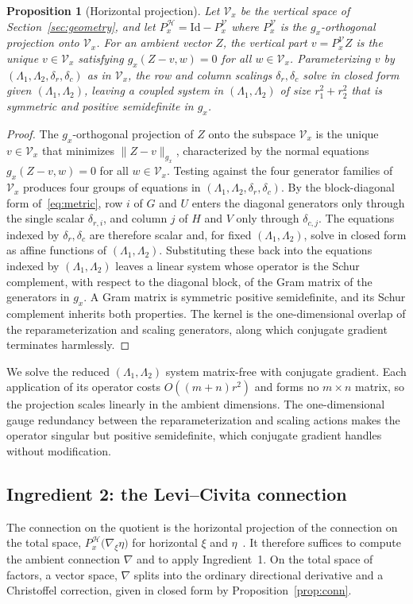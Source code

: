 \documentclass[letterpaper, 10 pt, conference]{ieeeconf}
\newcommand{\cV}{\mathcal{V}}
\newcommand{\cH}{\mathcal{H}}
\theoremstyle{plain}
\newtheorem{proposition}{Proposition}
\theoremstyle{definition}
\theoremstyle{remark}
\begin{document}
\begin{proposition}[Horizontal projection]\label{prop:hproj}
Let $\cV_x$ be the vertical space of Section~\ref{sec:geometry}, and let $P_x^{\cH}=\mathrm{Id}-P_x^{\cV}$ where $P_x^{\cV}$ is the $g_x$-orthogonal projection onto $\cV_x$. For an ambient vector $Z$, the vertical part $v=P_x^{\cV}Z$ is the unique $v\in\cV_x$ satisfying $g_x(Z-v,w)=0$ for all $w\in\cV_x$. Parameterizing $v$ by $(\Lambda_1,\Lambda_2,\delta_r,\delta_c)$ as in $\cV_x$, the row and column scalings $\delta_r,\delta_c$ solve in closed form given $(\Lambda_1,\Lambda_2)$, leaving a coupled system in $(\Lambda_1,\Lambda_2)$ of size $r_1^2+r_2^2$ that is symmetric and positive semidefinite in $g_x$.
\end{proposition}
\begin{proof}
The $g_x$-orthogonal projection of $Z$ onto the subspace $\cV_x$ is the unique $v\in\cV_x$ that minimizes $\|Z-v\|_{g_x}$, characterized by the normal equations $g_x(Z-v,w)=0$ for all $w\in\cV_x$. Testing against the four generator families of $\cV_x$ produces four groups of equations in $(\Lambda_1,\Lambda_2,\delta_r,\delta_c)$. By the block-diagonal form of~\eqref{eq:metric}, row $i$ of $G$ and $U$ enters the diagonal generators only through the single scalar $\delta_{r,i}$, and column $j$ of $H$ and $V$ only through $\delta_{c,j}$. The equations indexed by $\delta_r,\delta_c$ are therefore scalar and, for fixed $(\Lambda_1,\Lambda_2)$, solve in closed form as affine functions of $(\Lambda_1,\Lambda_2)$. Substituting these back into the equations indexed by $(\Lambda_1,\Lambda_2)$ leaves a linear system whose operator is the Schur complement, with respect to the diagonal block, of the Gram matrix of the generators in $g_x$. A Gram matrix is symmetric positive semidefinite, and its Schur complement inherits both properties. The kernel is the one-dimensional overlap of the reparameterization and scaling generators, along which conjugate gradient terminates harmlessly.
\end{proof}

We solve the reduced $(\Lambda_1,\Lambda_2)$ system matrix-free with conjugate gradient. Each application of its operator costs $O((m{+}n)r^2)$ and forms no $m\times n$ matrix, so the projection scales linearly in the ambient dimensions. The one-dimensional gauge redundancy between the reparameterization and scaling actions makes the operator singular but positive semidefinite, which conjugate gradient handles without modification.

\subsection{Ingredient 2: the Levi--Civita connection}
The connection on the quotient is the horizontal projection of the connection on the total space, $P_x^{\cH}\big(\nabla_\xi\eta\big)$ for horizontal $\xi$ and $\eta$~\cite{absilbook,boumal2023introduction}. It therefore suffices to compute the ambient connection $\nabla$ and to apply Ingredient~1. On the total space of factors, a vector space, $\nabla$ splits into the ordinary directional derivative and a Christoffel correction, given in closed form by Proposition~\ref{prop:conn}.
\end{document}
